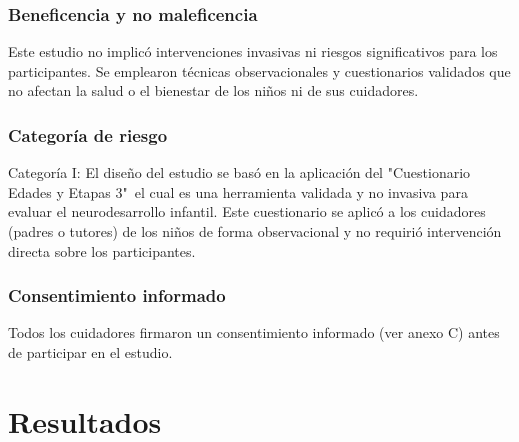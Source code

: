 \documentclass[11pt,letterpaper]{report}
\newcommand{\asq}{"Cuestionario Edades y Etapas 3"}
\begin{document}
\subsection{Beneficencia y no maleficencia}
Este estudio no implicó intervenciones invasivas ni riesgos significativos para
los participantes. Se emplearon técnicas observacionales y cuestionarios
validados que no afectan la salud o el bienestar de los niños ni de sus
cuidadores.

\subsection{Categoría de riesgo}
Categoría I: El diseño del estudio se basó en la aplicación del \asq\ el cual
es una herramienta validada y no invasiva para evaluar el neurodesarrollo
infantil. Este cuestionario se aplicó a los cuidadores (padres o tutores) de
los niños de forma observacional y no requirió intervención directa sobre los
participantes.

\subsection{Consentimiento informado}
Todos los cuidadores firmaron un consentimiento informado (ver anexo C) antes de
participar en el estudio.

\chapter{Resultados}
\end{document}
